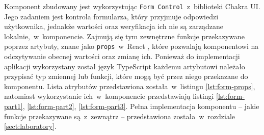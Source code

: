 Komponent zbudowany jest wykorzystując \texttt{Form Control}~z~biblioteki Chakra UI. Jego zadaniem
jest kontrola formularza, który przyjmuje odpowiedzi użytkownika, jednakże wartości oraz weryfikacja
ich nie są zarządzane lokalnie,~w~komponencie. Zajmują się tym zewnętrzne funkcje przekazywane
poprzez artybuty, znane jako \texttt {props}~w~React \cite{react-docs}, które pozwalają komponentowi
na odczytywanie obecnej wartości oraz zmianę ich. Ponieważ do implementacji aplikacji wykorzystany
został język TypeScript każdemu artybutowi należało przypisać typ zmiennej lub funkcji, które mogą
być przez niego przekazane do komponentu. Lista atrybutów przedstawiona została~w~listingu
\ref{lst:form-props}, natomiast wykorzystanie ich~w~komponencie przedstawiają listingi
\ref{lst:form-part1}, \ref{lst:form-part2}, \ref{lst:form-part3}. Pełna implementacja komponentu --
jakie funkcje przekazywane są~z~zewnątrz -- przedstawiona została~w~rozdziale \ref{sect:laboratory}.





